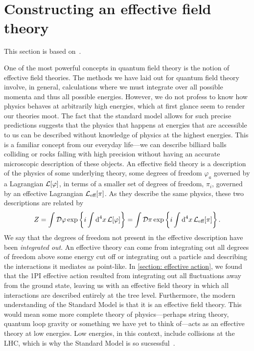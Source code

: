 \section{Constructing an effective field theory}
\label{section: effective field theories}

This section is based on~\autocite{pencoIntroductionEffectiveField2020,peskinIntroductionQuantumField1995,schererIntroductionChiralPerturbation2002,schwartzQuantumFieldTheory2013,weinbergDevelopmentEffectiveField2021}.

One of the most powerful concepts in quantum field theory is the notion of effective field theories.
The methods we have laid out for quantum field theory involve, in general, calculations where we must integrate over all possible momenta and thus all possible energies.
However, we do not profess to know how physics behaves at arbitrarily high energies, which at first glance seem to render our theories moot.
The fact that the standard model allows for such precise predictions suggests that the physics that happens at energies that are accessible to us can be described without knowledge of physics at the highest energies.
This is a familiar concept from our everyday life---we can describe billiard balls colliding or rocks falling with high precision without having an accurate microscopic description of these objects.
An effective field theory is a description of the physics of some underlying theory, some degrees of freedom $\varphi_a$ governed by a Lagrangian $\mathcal{L}[\varphi]$, in terms of a smaller set of degrees of freedom, $\pi_i$, governed by an effective Lagrangian $\mathcal{L}_\text{eff}[\pi]$.
As they describe the same physics, these two descriptions are related by 
%
\begin{equation}
    Z = \int \mathcal D \varphi \, \text{exp} \left\{ i\int \text{d}^4 x \, \mathcal{L}[\varphi] \right\}
    = \int \mathcal D \pi\, \text{exp} \left\{ i\int \text{d}^4 x \, \mathcal{L}_\text{eff}[\pi]  \right\}.
\end{equation}
%
We say that the degrees of freedom not present in the effective description have been \emph{integrated out}.
An effective theory can come from integrating out all degrees of freedom above some energy cut off or integrating out a particle and describing the interactions it mediates as point-like.
In \autoref{section: effective action}, we found that the 1PI effective action resulted from integrating out all fluctuations away from the ground state, leaving us with an effective field theory in which all interactions are described entirely at the tree level.
Furthermore, the modern understanding of the Standard Model is that it is an effective field theory.
This would mean some more complete theory of physics---perhaps string theory, quantum loop gravity or something we have yet to think of---acts as an effective theory at low energies.
Low energies, in this context, include collisions at the LHC, which is why the Standard Model is so sucsessful~\autocite{pencoIntroductionEffectiveField2020}.

